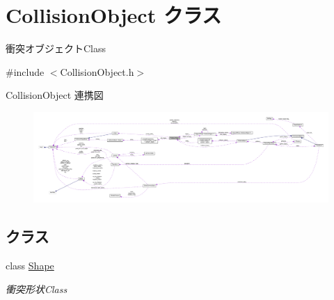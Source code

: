 \hypertarget{class_collision_object}{}\section{Collision\+Object クラス}
\label{class_collision_object}


衝突オブジェクト\+Class  




{\ttfamily \#include $<$Collision\+Object.\+h$>$}



Collision\+Object 連携図\nopagebreak
\begin{figure}[H]
\begin{center}
\leavevmode
\includegraphics[width=350pt]{class_collision_object__coll__graph}
\end{center}
\end{figure}
\subsection*{クラス}
\begin{DoxyCompactItemize}
\item 
class \mbox{\hyperlink{class_collision_object_1_1_shape}{Shape}}
\begin{DoxyCompactList}\small\item\em 衝突形状\+Class \end{DoxyCompactList}\end{DoxyCompactItemize}
